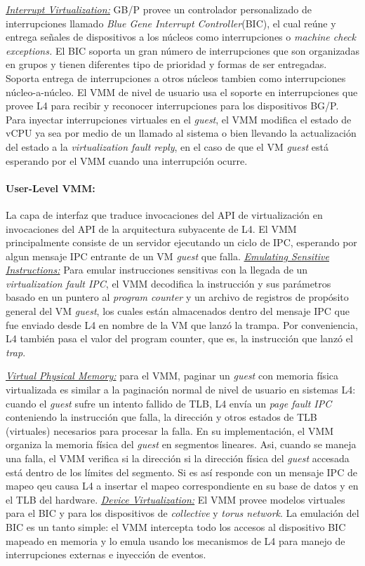 \underline{\emph{Interrupt Virtualization:}} GB/P provee un controlador personalizado de interrupciones llamado \emph{Blue Gene Interrupt Controller}(BIC), el cual reúne y entrega señales de dispositivos a los núcleos como interrupciones o \emph{machine check exceptions.} El BIC soporta un gran número de interrupciones que son organizadas en grupos y tienen diferentes tipo de prioridad y formas de ser entregadas. Soporta entrega de interrupciones a otros núcleos tambien como interrupciones núcleo-a-núcleo. El VMM de nivel de usuario usa el soporte en interrupciones que provee L4 para recibir y reconocer interrupciones para los dispositivos BG/P. Para inyectar interrupciones virtuales en el \emph{guest}, el VMM modifica el estado de vCPU ya sea por medio de un llamado al sistema o bien llevando la actualización del estado a la \emph{virtualization fault reply}, en el caso de que el VM \emph{guest} está esperando por el VMM cuando una interrupción ocurre.

\paragraph{\textnormal{\textbf{User-Level VMM:}}}
La capa de interfaz que traduce invocaciones del API de virtualización en invocaciones del API de la arquitectura subyacente de L4. El VMM principalmente consiste de un servidor ejecutando un ciclo de IPC, esperando por algun mensaje IPC entrante de un VM \emph{guest} que falla. \underline{\emph{Emulating Sensitive Instructions:}} Para emular instrucciones sensitivas con la llegada de un \emph{virtualization fault IPC}, el VMM decodifica la instrucción y sus parámetros basado en un puntero al \emph{program counter} y un archivo de registros de propósito general del VM \emph{guest}, los cuales están almacenados dentro del mensaje IPC que fue enviado desde L4 en nombre de la VM que lanzó la trampa. Por conveniencia, L4 también pasa el valor del program counter, que es, la instrucción que lanzó el \emph{trap}. 

\underline{\emph{Virtual Physical Memory:}} para el VMM, paginar un \emph{guest} con memoria física virtualizada es similar a la paginación normal de nivel de usuario en sistemas L4: cuando el \emph{guest} sufre un intento fallido de TLB, L4 envía un \emph{page fault IPC} conteniendo la instrucción que falla, la dirección y otros estados de TLB (virtuales) necesarios para procesar la falla. En su implementación, el VMM organiza la memoria física del \emph{guest} en segmentos lineares. Asi, cuando se maneja una falla, el VMM verifica  si la dirección si la dirección física del \emph{guest} accesada está dentro de los límites del segmento. Si es así responde con un mensaje IPC de mapeo qeu causa L4 a insertar el mapeo correspondiente en su base de datos y en el TLB del hardware. \underline{\emph{Device Virtualization:}} El VMM provee modelos virtuales para el BIC y para los dispositivos de \emph{collective} y \emph{torus network}. La emulación del BIC es un tanto simple: el VMM intercepta todo los accesos al dispositivo BIC mapeado en memoria y lo emula usando los mecanismos de L4 para manejo de interrupciones externas e inyección de eventos. 

